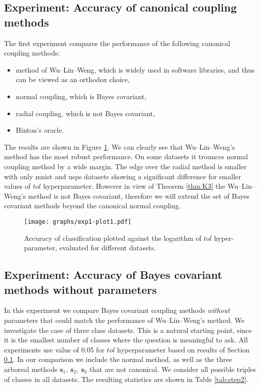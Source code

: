 \subsection{Experiment: Accuracy of canonical coupling methods} \label{sec:exp1}

The first experiment compares the performance of the following canonical coupling methods:
\begin{itemize}
\item method of Wu--Lin--Weng, which is widely used in software libraries, and thus can be viewed as an orthodox choice,
\item normal coupling, which is Bayes covariant,
\item radial coupling, which is not Bayes covariant,
\item Hinton's oracle.
\end{itemize}

% 
The results are shown in Figure \ref{fig:exp1-plot1}. We can clearly see that Wu--Lin--Weng's method has the most robust performance. On some datasets it trounces normal coupling method by a wide margin. The edge over the radial method is smaller with only mnist and usps datasets showing a significant difference for smaller values of $tol$ hyperparameter.  However in view of Theorem \ref{thm:K3} the Wu--Lin--Weng's method is not Bayes covariant, therefore we will extend the set of Bayes covariant methods beyond the canonical normal coupling.

\begin{figure}
	\texttt{[image: graphs/exp1-plot1.pdf]}
	\caption{Accuracy of classification plotted against the logarithm of $tol$ hyper-parameter, evaluated for different datasets.}
	\label{fig:exp1-plot1}
\end{figure}

\subsection{Experiment: Accuracy of Bayes covariant methods without parameters}
 \label{sec:exp2}


In this experiment we compare  Bayes covariant coupling methods \emph{without} parameters that could match the performance of Wu--Lin--Weng's method. We investigate  the case of three class datasets. This is a natural starting point, since it is the smallest number of classes where the question is meaningful to ask. All experiments use value of 0.05 for $tol$ hyperparameter based on results of Section \ref{sec:exp1}.  In our comparison we include the normal method, as well as the three arboreal methods $ \boldsymbol{s}_1,~ \boldsymbol{s}_2,~ \boldsymbol{s}_3$ that are not canonical. We consider all possible triples of classes in all datasets. The resulting statistics are shown in Table \ref{tab:step2}. 

